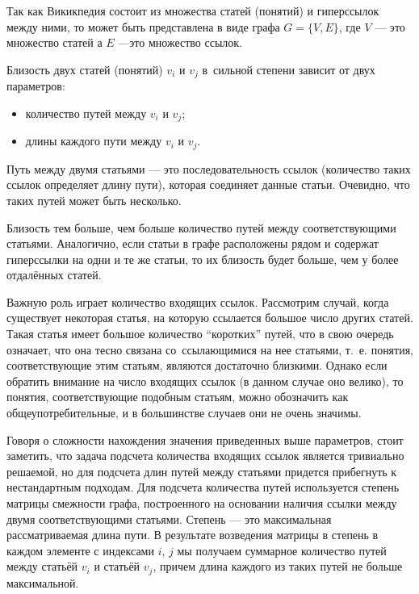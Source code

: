 Так как Викикпедия состоит из множества статей (понятий) и гиперссылок между ними, то может быть представлена
в виде графа $G = \{V,E\}$, где 
$V$  --- это множество статей
а $E$ ---это множество ссылок.

Близость двух статей (понятий) $v_i$ и $v_j$  в~сильной степени зависит от двух параметров:

\begin{itemize}

\item{
количество путей между $v_i$ и $v_j$;
}

\item {
длины каждого пути между $v_i$ и $v_j$.
}

\end{itemize}

Путь между двумя статьями --- это последовательность ссылок 
(количество таких ссылок определяет длину пути),
которая соединяет данные статьи. 
Очевидно, что таких путей может быть несколько. 

Близость тем больше, чем больше количество путей между соответствующими статьями. 
Аналогично, если статьи в графе расположены рядом и содержат гиперссылки на
одни и те же статьи, то их близость будет больше, чем у более  отдалённых статей.

Важную роль играет количество входящих ссылок. 
Рассмотрим случай, когда существует некоторая статья, на которую ссылается большое число других статей. 
Такая статья имеет большое количество ``коротких'' путей, что в свою очередь означает,
что она тесно связана со~ссылающимися на нее статьями, 
т.~е. понятия, соответствующие этим статьям, являются достаточно близкими. 
Однако если обратить внимание на число входящих ссылок (в данном случае оно велико), 
то понятия, соответствующие подобным статьям, можно обозначить как общеупотребительные,
и в большинстве случаев они не очень значимы. 

Говоря о сложности нахождения значения приведенных выше параметров, стоит заметить, что
задача подсчета количества входящих ссылок является тривиально решаемой, но для 
подсчета длин путей между статьями придется прибегнуть к нестандартным подходам. 
Для подсчета количества путей используется степень матрицы смежности графа, 
построенного на основании наличия ссылки между двумя соответствующими статьями. 
Степень --- это максимальная рассматриваемая длина пути. В результате возведения матрицы
в степень в каждом элементе с индексами $i$, $j$ мы получаем суммарное количество путей между статьёй $v_i$  и статьёй $v_j$,
причем длина каждого из таких путей не больше максимальной. 

